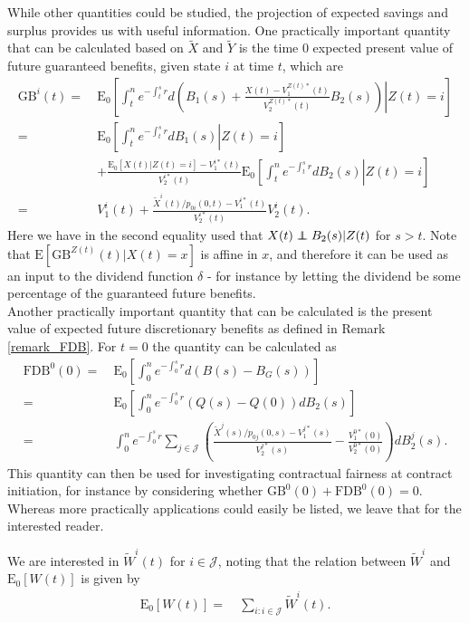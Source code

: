 \documentclass[12pt]{article}
\newcommand{\E}{\text{E}}
\newcommand{\indic}[1]{\mathds{1}_{ \{ #1 \} }}
\newcommand\independent{\protect\mathpalette{\protect\independenT}{\perp}}
\def\independenT#1#2{\mathrel{\rlap{$#1#2$}\mkern2mu{#1#2}}}
\theoremstyle{my_thm}
\theoremstyle{my_rem}
\begin{document}
\noindent
While other quantities could be studied, the projection of expected savings and surplus provides us with useful information. One practically important quantity that can be calculated based on $\tilde{X}$ and $\tilde{Y}$ is the time $0$ expected present value of future guaranteed benefits, given state $i$ at time $t$, which are
\begin{align*}
\text{GB}^i(t)= \ &\E_0 \left. \left[ \int_t^n e^{-\int_t^s r} d \left( B_1(s)+\frac{X(t)-V_1^{Z(t)*}(t)}{V_2^{Z(t)*}(t)}B_2(s) \right) \right| Z(t)=i\right]
\\
= \ &
\E_0 \left[ \left. \int_t^n e^{-\int_t^s r} d B_1(s) \right| Z(t)=i \right]
\\
&+ \frac{\E_0[X(t)|Z(t)=i]-V_1^{i*}(t)}{V_2^{i*}(t)}  \E_0 \left. \left[ \int_t^n e^{-\int_t^s r} dB_2(s) \right| Z(t)=i\right]
\\
= \ &
V_1^i(t)+\frac{\tilde{X}^{i}(t)/p_{0i}(0,t)-V_1^{i*}(t)}{V_2^{i*}(t)}V_2^i(t).
\end{align*}
Here we have in the second equality used that $X(t)\independent B_2(s)|Z(t)$ for $s>t$. Note that $\E[\text{GB}^{Z(t)}(t)|X(t)=x]$ is affine in $x$, and therefore it can be used as an input to the dividend function $\delta$ - for instance by letting the dividend be some percentage of the guaranteed future benefits.
\\[12pt]
Another practically important quantity that can be calculated is the present value of expected future discretionary benefits as defined in Remark \ref{remark_FDB}. For $t=0$ the quantity can be calculated as
\begin{align*}
\text{FDB}^0(0)= \ &\E_0 \left[ \int_0^n e^{-\int_0^s r} d \left( B(s) - B_G(s)\right)  \right]
\\
= \ &
\E_0 \left[ \int_0^n e^{-\int_0^s r} \left( Q(s) - Q(0)\right)dB_2(s) \right]
\\
= \ &
\int_0^n e^{-\int_0^s r} \sum_{j \in \mathcal{J}} \left( \frac{\tilde{X}^j(s)/p_{0j}(0,s)-V_1^{j*}(s)}{V_2^{j*}(s)} - \frac{V_1^{0*}(0)}{V_2^{0*}(0)}\right)dB_2^j(s).
\end{align*}
This quantity can then be used for investigating contractual fairness at contract initiation, for instance by considering whether $\text{GB}^{0}(0)+\text{FDB}^{0}(0)=0$.
\\[12pt]
Whereas more practically applications could easily be listed, we leave that for the interested reader. 

\iffalse
We are interested in $\tilde{W}^i(t)$ for $i \in \mathcal{J}$, noting that the relation between $\tilde{W}^i$ and $\E_0[W(t)]$ is given by
\begin{align*}
\E_0[W(t)] = \ &
\sum_{i:i\in \mathcal{J}} \tilde{W}^i(t).
\end{align*}
\end{document}
